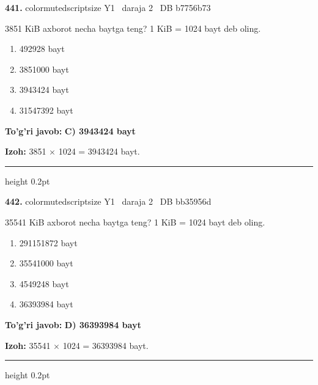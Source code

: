 \documentclass[10pt,a4paper,oneside]{article}
\begin{document}
\noindent\textbf{\color{ink}441.}  {color{muted}scriptsize Y1 \textbullet\ daraja 2 \textbullet\ DB b7756b73}
\par
3851 KiB axborot necha baytga teng? 1 KiB = 1024 bayt deb oling.
\begin{enumerate}[label=\Alph*),leftmargin=9mm]
\item 492928 bayt
\item 3851000 bayt
\item 3943424 bayt
\item 31547392 bayt
\end{enumerate}
\begin{tcolorbox}[enhanced,breakable,colback=teal!4,colframe=teal!50!black,boxrule=0.5pt,arc=1.1mm,left=3mm,right=3mm,top=1.7mm,bottom=1.7mm,before skip=2mm,after skip=2mm]
\textbf{\color{teal}To'g'ri javob:} \textbf{C) 3943424 bayt}
\par\smallskip
\textbf{Izoh:} 3851 \ensuremath{\times} 1024 = 3943424 bayt.
\end{tcolorbox}
\vspace{2mm}\hrule height 0.2pt \vspace{3mm}

\noindent\textbf{\color{ink}442.}  {color{muted}scriptsize Y1 \textbullet\ daraja 2 \textbullet\ DB bb35956d}
\par
35541 KiB axborot necha baytga teng? 1 KiB = 1024 bayt deb oling.
\begin{enumerate}[label=\Alph*),leftmargin=9mm]
\item 291151872 bayt
\item 35541000 bayt
\item 4549248 bayt
\item 36393984 bayt
\end{enumerate}
\begin{tcolorbox}[enhanced,breakable,colback=teal!4,colframe=teal!50!black,boxrule=0.5pt,arc=1.1mm,left=3mm,right=3mm,top=1.7mm,bottom=1.7mm,before skip=2mm,after skip=2mm]
\textbf{\color{teal}To'g'ri javob:} \textbf{D) 36393984 bayt}
\par\smallskip
\textbf{Izoh:} 35541 \ensuremath{\times} 1024 = 36393984 bayt.
\end{tcolorbox}
\vspace{2mm}\hrule height 0.2pt \vspace{3mm}
\end{document}
